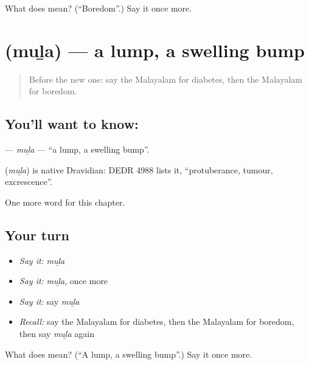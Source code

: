 \begin{tcolorbox}[breakable,colback=teal!4,colframe=teal!35!black,title={Before you move on}]
What does  mean? (\textquotedblleft{}Boredom\textquotedblright{}.) Say it once more.
\end{tcolorbox}
\section[\texorpdfstring{\ml{മുഴ} (muḻa)}{മുഴ (muḻa)}]{ (muḻa) — a lump, a swelling bump}

\label{lesson:ML-C275-mula3}



\begin{quote}
Before the new one: say the Malayalam for diabetes, then the Malayalam for boredom.
\end{quote}

\subsection*{You'll want to know: }
\textbf{} — \emph{muḻa} — \textquotedblleft{}a lump, a swelling bump\textquotedblright{}.

\begin{cousinweb}
\textbf{} (\emph{muḻa}) is native Dravidian: DEDR 4988 lists it, \textquotedblleft{}protuberance, tumour, excrescence\textquotedblright{}.
\end{cousinweb}

\begin{grammarlens}[title={What you've built}]
One more word for this chapter.
\end{grammarlens}

\subsection*{Your turn}
\begin{itemize}
\raggedright
  \item \emph{Say it:} \emph{muḻa}
  \item \emph{Say it:} \emph{muḻa}, once more
  \item \emph{Say it:} say \emph{muḻa}
  \item \emph{Recall:} say the Malayalam for diabetes, then the Malayalam for boredom, then say \emph{muḻa} again
\end{itemize}

\begin{tcolorbox}[breakable,colback=teal!4,colframe=teal!35!black,title={Before you move on}]
What does  mean? (\textquotedblleft{}A lump, a swelling bump\textquotedblright{}.) Say it once more.
\end{tcolorbox}
